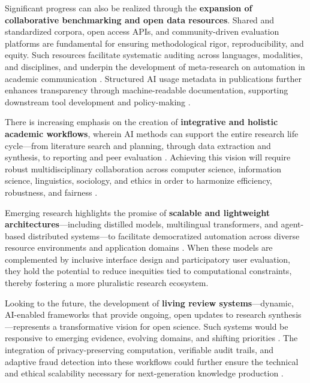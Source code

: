 Significant progress can also be realized through the \textbf{expansion of collaborative benchmarking and open data resources}. Shared and standardized corpora, open access APIs, and community-driven evaluation platforms are fundamental for ensuring methodological rigor, reproducibility, and equity. Such resources facilitate systematic auditing across languages, modalities, and disciplines, and underpin the development of meta-research on automation in academic communication \cite{ref41,ref62,ref63,ref68,ref78,ref80,ref81,ref84,ref86,ref87,ref88,ref89,ref90,ref91,ref94,ref99,ref100,ref103,ref104,ref105,ref108,ref109,ref111,ref112,ref113,ref115,ref117}. Structured AI usage metadata in publications further enhances transparency through machine-readable documentation, supporting downstream tool development and policy-making \cite{ref110,ref115}.

There is increasing emphasis on the creation of \textbf{integrative and holistic academic workflows}, wherein AI methods can support the entire research life cycle—from literature search and planning, through data extraction and synthesis, to reporting and peer evaluation \cite{ref61,ref68,ref89,ref99,ref103,ref104,ref108,ref109,ref110,ref115,ref117}. Achieving this vision will require robust multidisciplinary collaboration across computer science, information science, linguistics, sociology, and ethics in order to harmonize efficiency, robustness, and fairness \cite{ref108,ref110}.

Emerging research highlights the promise of \textbf{scalable and lightweight architectures}—including distilled models, multilingual transformers, and agent-based distributed systems—to facilitate democratized automation across diverse resource environments and application domains \cite{ref38,ref62,ref63,ref64,ref68,ref81,ref99,ref102,ref103,ref109,ref110,ref111,ref113,ref115}. When these models are complemented by inclusive interface design and participatory user evaluation, they hold the potential to reduce inequities tied to computational constraints, thereby fostering a more pluralistic research ecosystem.

Looking to the future, the development of \textbf{living review systems}—dynamic, AI-enabled frameworks that provide ongoing, open updates to research synthesis—represents a transformative vision for open science. Such systems would be responsive to emerging evidence, evolving domains, and shifting priorities \cite{ref78,ref84,ref97,ref103,ref104,ref105,ref108,ref110,ref112,ref113,ref114}. The integration of privacy-preserving computation, verifiable audit trails, and adaptive fraud detection into these workflows could further ensure the technical and ethical scalability necessary for next-generation knowledge production \cite{ref73,ref76,ref80,ref81,ref85,ref92,ref94,ref104,ref115,ref117}.

